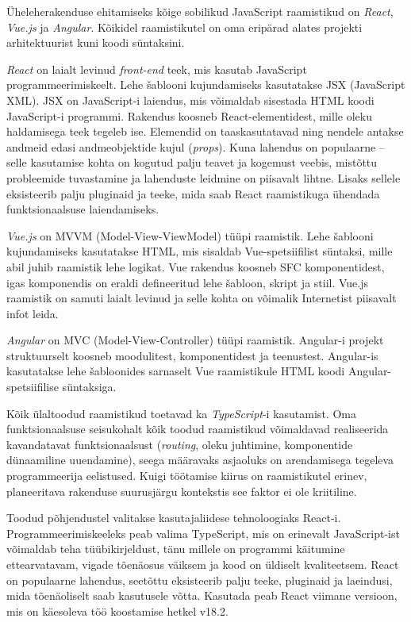 Üheleherakenduse ehitamiseks kõige sobilikud JavaScript raamistikud on \textit{React}, \textit{Vue.js}
ja \textit{Angular}. Kõikidel raamistikutel on oma eripärad alates projekti arhitektuurist kuni 
koodi süntaksini. 

\textit{React} on laialt levinud \textit{front-end} teek, mis kasutab JavaScript programmeerimiskeelt. 
Lehe šablooni kujundamiseks kasutatakse JSX (JavaScript XML). JSX on JavaScript-i laiendus, mis võimaldab
sisestada HTML koodi JavaScript-i programmi. Rakendus koosneb React-elementidest, mille oleku haldamisega teek
tegeleb ise. Elemendid on taaskasutatavad ning nendele antakse andmeid edasi andmeobjektide kujul (\textit{props}).
Kuna lahendus on populaarne -- selle kasutamise kohta on kogutud palju teavet ja kogemust veebis, mistõttu
probleemide tuvastamine ja lahenduste leidmine on piisavalt lihtne. Lisaks sellele eksisteerib palju pluginaid
ja teeke, mida saab React raamistikuga ühendada funktsionaalsuse laiendamiseks. 

\textit{Vue.js} on MVVM (Model-View-ViewModel) tüüpi raamistik. Lehe šablooni kujundamiseks kasutatakse HTML, 
mis sisaldab Vue-spetsiifilist süntaksi, mille abil juhib raamistik lehe logikat. Vue rakendus koosneb SFC 
komponentidest, igas komponendis on eraldi defineeritud lehe šabloon, skript ja stiil. Vue.js raamistik on
samuti laialt levinud ja selle kohta on võimalik Internetist piisavalt infot leida.

\textit{Angular} on MVC (Model-View-Controller) tüüpi raamistik. Angular-i projekt struktuurselt koosneb
moodulitest, komponentidest ja teenustest. Angular-is kasutatakse lehe šabloonides sarnaselt Vue raamistikule
HTML koodi Angular-spetsiifilise süntaksiga. 

Kõik ülaltoodud raamistikud toetavad ka \textit{TypeScript}-i kasutamist. Oma funktsionaalsuse seisukohalt
kõik toodud raamistikud võimaldavad realiseerida kavandatavat funktsionaalsust (\textit{routing}, 
oleku juhtimine, komponentide dünaamiline uuendamine), seega määravaks asjaoluks on arendamisega tegeleva 
programmeerija eelistused. Kuigi töötamise kiirus on raamistikutel erinev, planeeritava rakenduse suurusjärgu
kontekstis see faktor ei ole kriitiline. 

Toodud põhjendustel valitakse kasutajaliidese tehnoloogiaks React-i. Programmeerimiskeeleks peab valima TypeScript, 
mis on erinevalt JavaScript-ist võimaldab teha tüübikirjeldust, tänu millele on programmi käitumine ettearvatavam, 
vigade tõenäosus väiksem ja kood on üldiselt kvaliteetsem. React on populaarne lahendus, seetõttu eksisteerib palju
teeke, pluginaid ja laeindusi, mida tõenäoliselt saab kasutusele võtta. Kasutada peab React viimane versioon,
mis on käesoleva töö koostamise hetkel v18.2.



